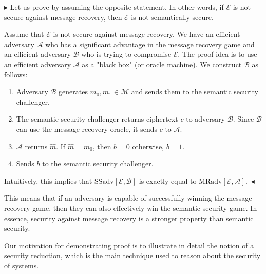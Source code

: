 \documentclass[../lecture-notes-148x210.tex]{subfiles}
\begin{document}
$\blacktriangleright$ 
Let us prove by assuming the opposite statement. 
In other words, if $\mathcal{E}$ is not secure against message recovery, then $\mathcal{E}$ is not semantically secure.

Assume that $\mathcal{E}$ is not secure against message recovery. 
We have an efficient adversary $\mathcal{A}$ who has a significant advantage in the 
message recovery game and an efficient adversary $\mathcal{B}$ who is trying to 
compromise $\mathcal{E}$.
The proof idea is to use an efficient adversary $\mathcal{A}$ as a "black box" (or oracle machine). %
We construct $\mathcal{B}$ as follows:
\begin{enumerate}
    \item Adversary $\mathcal{B}$ generates $m_0, m_1 \in \mathcal{M}$ and sends them to the semantic security challenger.
    \item The semantic security challenger returns ciphertext $c$ to adversary $\mathcal{B}$. Since $\mathcal{B}$ can use 
    the message recovery oracle, it sends $c$ to $\mathcal{A}$. 
    \item $\mathcal{A}$ returns $\hat{m}$. If $\hat{m} = m_0$, then $b = 0$ otherwise, $b = 1$.
    \item Sends $b$ to the semantic security challenger. 
\end{enumerate}

Intuitively, this implies that $\text{SSadv}[\mathcal{E}, \mathcal{B}]$ is exactly equal 
to $\text{MRadv}[\mathcal{E}, \mathcal{A}]$.~$\blacktriangleleft$

This means that if an adversary is capable of successfully winning the 
message recovery game, then they can also effectively win the semantic security game.
In essence, security against message recovery is a stronger property than
semantic security. 

Our motivation for demonstrating proof is to illustrate in detail the notion of a security
reduction, which is the main technique used to reason about the security of systems.
\end{document}
